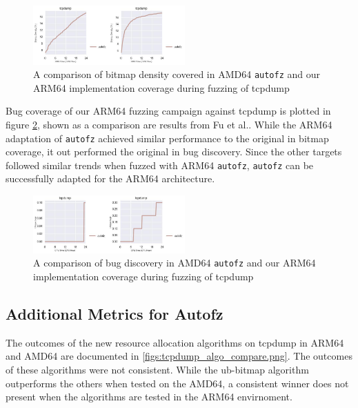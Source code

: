\begin{figure}
    \includegraphics[width=0.52\textwidth]{figs/tcpdump_compare_orig_arm64.png}
    \centering
    \caption{A comparison of bitmap density covered in AMD64 \texttt{autofz} and our ARM64 implementation
    coverage during fuzzing of tcpdump}
    \label{fig:tcpdump_compare_orig_arm64}
\end{figure}

Bug coverage of our ARM64 fuzzing campaign against tcpdump is plotted in figure \ref{figs:tcp_compare_orig_arm64_ub.png}, 
shown as a comparison are results from Fu et al.\cite{fu_autofz_2023}. While the ARM64 adaptation of \texttt{autofz} achieved similar
performance to the original in bitmap coverage, it out performed the original in bug discovery. Since the other targets followed similar trends
when fuzzed with ARM64 \texttt{autofz}, \texttt{autofz} can be successfully adapted for the ARM64 architecture.

\begin{figure}
    \includegraphics[width=0.52\textwidth]{figs/tcpdump_compare_orig_arm64_ub.png}
    \centering
    \caption{A comparison of bug discovery in AMD64 \texttt{autofz} and our ARM64 implementation
    coverage during fuzzing of tcpdump}
    \label{figs:tcp_compare_orig_arm64_ub.png}
\end{figure}

\subsection{Additional Metrics for Autofz}

The outcomes of the new resource allocation algorithms on tcpdump in ARM64 and AMD64 are documented in \ref{figs:tcpdump_algo_compare.png}. 
The outcomes of these algorithms were not consistent. While the ub-bitmap algorithm outperforms the others when tested on the AMD64, a 
consistent winner does not present when the algorithms are tested in the ARM64 envirnoment. 

